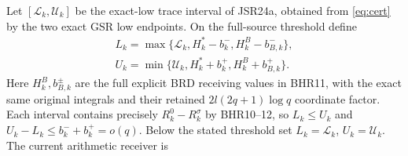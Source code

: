 Let $[\mathscr L_k,\mathscr U_k]$ be the exact-low trace
interval of JSR24a, obtained from \eqref{eq:cert} by the two
exact GSR low endpoints. On the full-source threshold define
\begin{equation}
\begin{gathered}
 L_k=\max\{\mathscr L_k,H_k^*-b_k^-,H_k^B-b_{B,k}^-\},\\
 U_k=\min\{\mathscr U_k,H_k^*+b_k^+,H_k^B+b_{B,k}^+\}.
\end{gathered}
\end{equation}
Here $H_k^B,b_{B,k}^\pm$ are the full explicit BRD receiving
values in BHR11, with the exact same original integrals and
their retained $2l(2q+1)\log q$ coordinate factor. Each interval
contains precisely $R_k^0-R_k^\sigma$ by BHR10--12, so
$L_k\leq U_k$ and $U_k-L_k\leq b_k^-+b_k^+=o(q)$.
Below the stated threshold set
$L_k=\mathscr L_k$, $U_k=\mathscr U_k$.
The current arithmetic receiver is